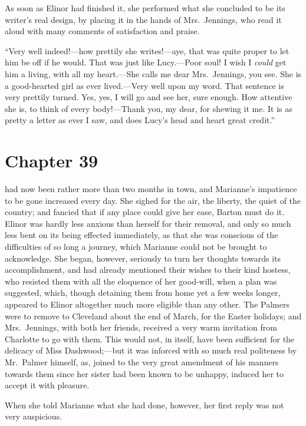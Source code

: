 As soon as Elinor had finished it, she performed
what she concluded to be its writer's real design,
by placing it in the hands of Mrs.\ Jennings, who read it
aloud with many comments of satisfaction and praise.

``Very well indeed!---how prettily she writes!---aye,
that was quite proper to let him be off if he would.
That was just like Lucy.---Poor soul! I wish I \emph{could} get
him a living, with all my heart.---She calls me dear
Mrs.\ Jennings, you see.  She is a good-hearted girl
as ever lived.---Very well upon my word.  That sentence
is very prettily turned.  Yes, yes, I will go and see her,
sure enough.  How attentive she is, to think of every
body!---Thank you, my dear, for shewing it me.  It is
as pretty a letter as ever I saw, and does Lucy's head
and heart great credit.''



\chapter{Chapter 39}


 had now been rather more than
two months in town, and Marianne's impatience to be gone
increased every day.  She sighed for the air, the liberty,
the quiet of the country; and fancied that if any place
could give her ease, Barton must do it.  Elinor was hardly
less anxious than herself for their removal, and only so much
less bent on its being effected immediately, as that she
was conscious of the difficulties of so long a journey,
which Marianne could not be brought to acknowledge.
She began, however, seriously to turn her thoughts towards
its accomplishment, and had already mentioned their wishes
to their kind hostess, who resisted them with all the
eloquence of her good-will, when a plan was suggested,
which, though detaining them from home yet a few weeks
longer, appeared to Elinor altogether much more eligible
than any other. The Palmers were to remove to Cleveland
about the end of March, for the Easter holidays;
and Mrs.\ Jennings, with both her friends, received a very
warm invitation from Charlotte to go with them.  This would
not, in itself, have been sufficient for the delicacy of
Miss Dashwood;---but it was inforced with so much real
politeness by Mr.\ Palmer himself, as, joined to the very
great amendment of his manners towards them since her
sister had been known to be unhappy, induced her to accept
it with pleasure.

When she told Marianne what she had done, however,
her first reply was not very auspicious.

